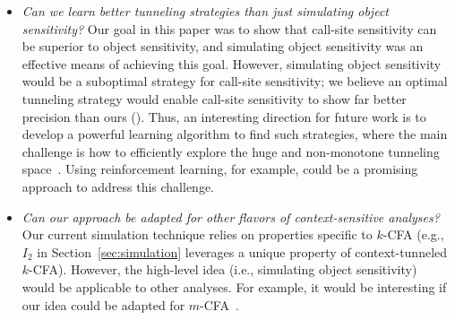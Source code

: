 \begin{itemize}

\item {\em Can we learn better tunneling strategies than just simulating object sensitivity?} 
Our goal in this paper was to show that call-site sensitivity can be superior to object sensitivity, and simulating object sensitivity was an effective means of achieving this goal. 
However, simulating object sensitivity would be a suboptimal strategy for call-site sensitivity; 
we believe an optimal tunneling strategy would enable call-site sensitivity to show far better precision than ours (\ours).
Thus, an interesting direction for future work is to develop a powerful learning algorithm to find such strategies, where 
the main challenge is how to efficiently explore the huge and non-monotone tunneling space~\cite{JeJeOh18}. Using reinforcement learning, for example, could be a promising approach to address this challenge. 


\item {\em Can our approach be adapted for other flavors of context-sensitive analyses?}
Our current simulation technique relies on properties specific to $k$-CFA (e.g., $I_2$ in Section~\ref{sec:simulation} leverages a unique property of context-tunneled $k$-CFA). However, the high-level idea (i.e., simulating object sensitivity) would be applicable to other analyses. 
For example, it would be interesting if our idea could be adapted for $m$-CFA~\cite{Might10}. 






\end{itemize}






